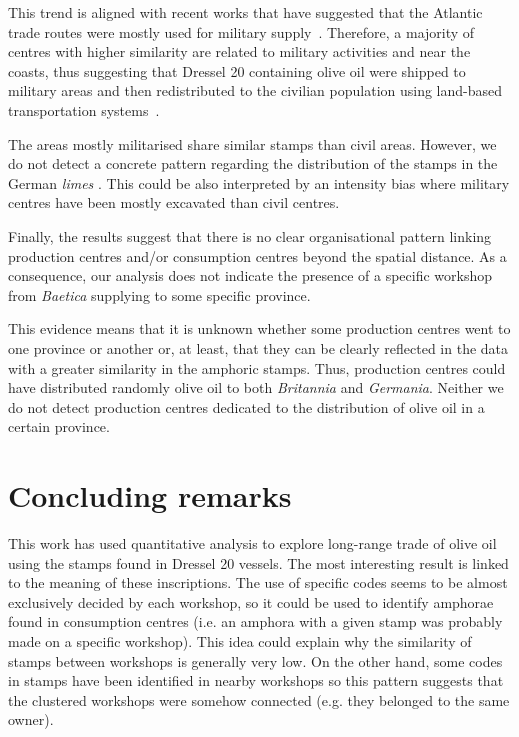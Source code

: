 This trend is aligned with recent works that have suggested that the Atlantic trade routes were mostly used for military supply~\citep{remesal_annona_1986,
remesal_provincial_2008,
carreras_atlantic_2012,
morillo_hispania_2016}. Therefore, a majority of centres with higher similarity are related to military activities and near the coasts, thus suggesting that Dressel 20 containing olive oil were shipped to military areas and then redistributed to the civilian population using land-based transportation systems~\citep{carreras_britannia_1998,
orengo_seeds_2016,
ayllon_olive_2018}.
 
The areas mostly militarised share similar stamps than civil areas. However, we do not detect a concrete pattern regarding the distribution of the stamps in the German \textit{limes} \citep{xanten2018}. This could be also interpreted by an intensity bias where military centres have been mostly excavated than civil centres.


Finally, the results suggest that there is no clear organisational pattern linking production centres and/or consumption centres beyond the spatial distance. As a consequence, our analysis does not indicate the presence of a specific workshop from \textit{Baetica} supplying to some specific province. 

This evidence means that it is unknown whether some production centres went to one province or another or, at least, that they can be clearly reflected in the data with a greater similarity in the amphoric stamps. Thus, production centres could have distributed randomly olive oil to both \textit{Britannia} and \textit{Germania}. Neither we do not detect production centres dedicated to the distribution of olive oil in a certain province. 


\section{Concluding remarks}
\label{sec:8}

This work has used quantitative analysis to explore long-range trade of olive oil using the stamps found in Dressel 20 vessels. The most interesting result is linked to the meaning of these inscriptions. The use of specific codes seems to be almost exclusively decided by each workshop, so it could be used to identify amphorae found in consumption centres (i.e. an amphora with a given stamp was probably made on a specific workshop). This idea could explain why the similarity of stamps between workshops is generally very low. On the other hand, some codes in stamps have been identified in nearby workshops so this pattern suggests that the clustered workshops were somehow connected (e.g. they belonged to the same owner).

